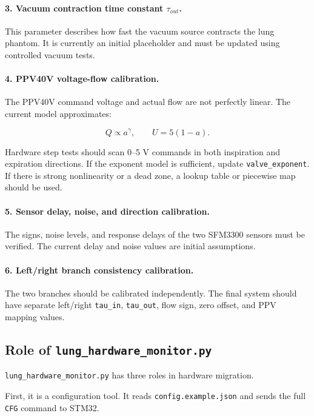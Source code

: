 \documentclass[11pt,a4paper]{article}
\begin{document}
\paragraph{3. Vacuum contraction time constant \texorpdfstring{$\tau_{out}$}{tau\_out}.}
This parameter describes how fast the vacuum source contracts the lung phantom. It is currently an initial placeholder and must be updated using controlled vacuum tests.

\paragraph{4. PPV40V voltage-flow calibration.}
The PPV40V command voltage and actual flow are not perfectly linear. The current model approximates:

\begin{equation}
  Q \propto a^\gamma,
  \qquad
  U=5(1-a).
\end{equation}

Hardware step tests should scan 0--5 V commands in both inspiration and expiration directions. If the exponent model is sufficient, update \texttt{valve\_exponent}. If there is strong nonlinearity or a dead zone, a lookup table or piecewise map should be used.

\paragraph{5. Sensor delay, noise, and direction calibration.}
The signs, noise levels, and response delays of the two SFM3300 sensors must be verified. The current delay and noise values are initial assumptions.

\paragraph{6. Left/right branch consistency calibration.}
The two branches should be calibrated independently. The final system should have separate left/right \texttt{tau\_in}, \texttt{tau\_out}, flow sign, zero offset, and PPV mapping values.

\subsection{Role of \texttt{lung\_hardware\_monitor.py}}

\texttt{lung\_hardware\_monitor.py} has three roles in hardware migration.

First, it is a configuration tool. It reads \texttt{config.example.json} and sends the full \texttt{CFG} command to STM32.
\end{document}
